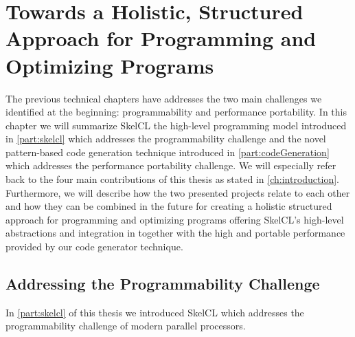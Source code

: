 
\chapter[Towards a Holistic, Structured Approach for\\ Programming and Optimizing Programs]{Towards a Holistic, Structured Approach for Programming and Optimizing Programs}

\label{ch:seventh} %

The previous technical chapters have addresses the two main challenges we identified at the beginning: programmability and performance portability.
In this chapter we will summarize SkelCL the high-level programming model introduced in \autoref{part:skelcl} which addresses the programmability challenge and the novel pattern-based code generation technique introduced in \autoref{part:codeGeneration} which addresses the performance portability challenge.
We will especially refer back to the four main contributions of this thesis as stated in \autoref{ch:introduction}.
Furthermore, we will describe how the two presented projects relate to each other and how they can be combined in the future for creating a holistic structured approach for programming and optimizing programs offering SkelCL's high-level abstractions and integration in \Cpp together with the high and portable performance provided by our code generator technique.

\section{Addressing the Programmability Challenge}

In \autoref{part:skelcl} of this thesis we introduced SkelCL which addresses the programmability challenge of modern parallel processors.

